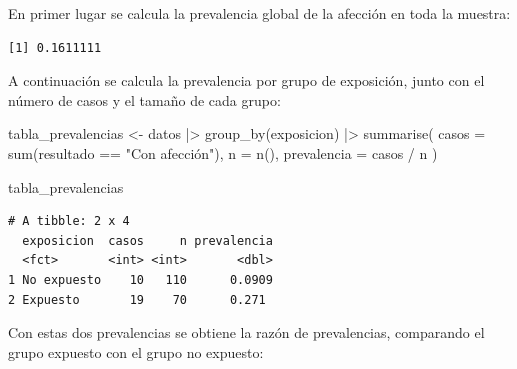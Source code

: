 \documentclass[
  spanish,
  a4paper,
]{scrreport}
\newenvironment{Shaded}{\begin{snugshade}}{\end{snugshade}}
\newcommand{\AttributeTok}[1]{\textcolor[rgb]{0.40,0.45,0.13}{#1}}
\newcommand{\FunctionTok}[1]{\textcolor[rgb]{0.28,0.35,0.67}{#1}}
\newcommand{\NormalTok}[1]{\textcolor[rgb]{0.00,0.23,0.31}{#1}}
\newcommand{\OtherTok}[1]{\textcolor[rgb]{0.00,0.23,0.31}{#1}}
\newcommand{\SpecialCharTok}[1]{\textcolor[rgb]{0.37,0.37,0.37}{#1}}
\newcommand{\StringTok}[1]{\textcolor[rgb]{0.13,0.47,0.30}{#1}}
\theoremstyle{definition}
\theoremstyle{definition}
\theoremstyle{remark}
\begin{document}
En primer lugar se calcula la prevalencia global de la afección en toda
la muestra:

\begin{Shaded}
\end{Shaded}

\begin{verbatim}
[1] 0.1611111
\end{verbatim}

A continuación se calcula la prevalencia por grupo de exposición, junto
con el número de casos y el tamaño de cada grupo:

\begin{Shaded}
\begin{Highlighting}[]
\NormalTok{tabla\_prevalencias }\OtherTok{\textless{}{-}}\NormalTok{ datos }\SpecialCharTok{|\textgreater{}}
  \FunctionTok{group\_by}\NormalTok{(exposicion) }\SpecialCharTok{|\textgreater{}}
  \FunctionTok{summarise}\NormalTok{(}
    \AttributeTok{casos =} \FunctionTok{sum}\NormalTok{(resultado }\SpecialCharTok{==} \StringTok{"Con afección"}\NormalTok{),}
    \AttributeTok{n =} \FunctionTok{n}\NormalTok{(),}
    \AttributeTok{prevalencia =}\NormalTok{ casos }\SpecialCharTok{/}\NormalTok{ n}
\NormalTok{  )}

\NormalTok{tabla\_prevalencias}
\end{Highlighting}
\end{Shaded}

\begin{verbatim}
# A tibble: 2 x 4
  exposicion  casos     n prevalencia
  <fct>       <int> <int>       <dbl>
1 No expuesto    10   110      0.0909
2 Expuesto       19    70      0.271 
\end{verbatim}

Con estas dos prevalencias se obtiene la razón de prevalencias,
comparando el grupo expuesto con el grupo no expuesto:

\begin{Shaded}
\end{Shaded}
\end{document}
